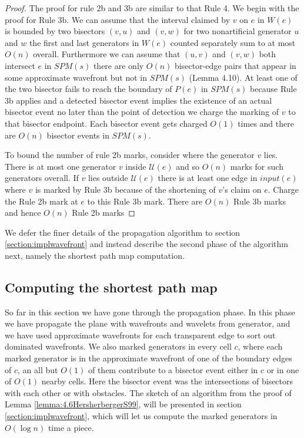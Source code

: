 \begin{proof}
	The proof for rule 2b and 3b are similar to that Rule 4. We begin with the
	proof for Rule 3b. We can assume that the interval claimed by $v$ on $e$ in
	$W(e)$ is bounded by two bisectors $(v,u)$ and $(v,w)$ for two nonartificial
	generator $u$ and $w$ the first and last generators in $W(e)$ counted
	separately sum to at most $O(n)$ overall. Furthermore we can assume that
	$(u,v)$ and $(v,w)$ both intersect $e$ in $SPM(s)$ there are only $O(n)$
	bisector-edge pairs that appear in some approximate wavefront but not in
	$SPM(s)$ (Lemma 4.10). At least one of the two bisector fails to reach the
	boundary of $P(e)$ in $SPM(s)$ because Rule 3b applies and a detected
	bisector event implies the existence of an actual bisector event no later
	than the point of detection we charge the marking of $v$ to that bisector
	endpoint. Each bisector event gets charged $O(1)$ times and there are $O(n)$
	bisector events in $SPM(s)$.

	To bound the number of rule 2b marks, consider where the generator $v$ lies.
	There is at most one generator $v$ inside $\mathcal{U}(e)$ and so $O(n)$
	marks for such generators overall. If $v$ lies outside $\mathcal{U}(e)$
	there is at least one edge in $input(e)$ where $v$ is marked by Rule 3b
	because of the shortening of $v$'s claim on $e$. Charge the Rule 2b mark at
	$e$ to this Rule 3b mark. There are $O(n)$ Rule 3b marks and hence $O(n)$
	Rule 2b marks
\end{proof}
We defer the finer details of the propagation algorithm to section 
\ref{section:implwavefront} and instead describe the second phase of the 
algorithm next, namely the shortest path map computation.


\subsection{Computing the shortest path map}

So far in this section we have gone through the propagation phase. In this phase we have 
propagate the plane with wavefronts and wavelets from generator, and we have used approximate 
wavefronts for each transparent edge to sort out dominated wavefronts. We also marked generators
in every cell $c$, where each marked generator is in the approximate wavefront of one of the 
boundary edges of $c$, an all but $O(1)$ of them contribute to a bisector event either in $c$ or 
in one of $O(1)$ nearby cells. Here the bisector event was the intersections of bisectors with 
each other or with obstacles. The sketch of an algorithm from the proof of Lemma 
\ref{lemma:4.6HersherbergerS99}, will be presented in section \ref{section:implwavefront}, which 
will let us compute the marked generators in $O(\log n)$ time a piece. 

